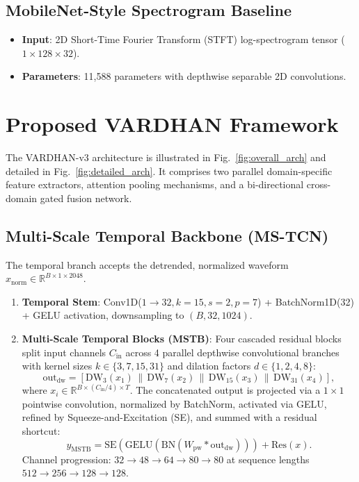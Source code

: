 \documentclass[journal,10pt,twocolumn]{IEEEtran}
\begin{document}
\subsection{MobileNet-Style Spectrogram Baseline}
\begin{itemize}
    \item \textbf{Input}: 2D Short-Time Fourier Transform (STFT) log-spectrogram tensor ($1 \times 128 \times 32$).
    \item \textbf{Parameters}: 11,588 parameters with depthwise separable 2D convolutions.
\end{itemize}

\section{Proposed VARDHAN Framework}
The VARDHAN-v3 architecture is illustrated in Fig.~\ref{fig:overall_arch} and detailed in Fig.~\ref{fig:detailed_arch}. It comprises two parallel domain-specific feature extractors, attention pooling mechanisms, and a bi-directional cross-domain gated fusion network.

\subsection{Multi-Scale Temporal Backbone (MS-TCN)}
The temporal branch accepts the detrended, normalized waveform $x_{\text{norm}} \in \mathbb{R}^{B \times 1 \times 2048}$.
\begin{enumerate}
    \item \textbf{Temporal Stem}: Conv1D($1 \rightarrow 32, k=15, s=2, p=7$) + BatchNorm1D(32) + GELU activation, downsampling to $(B, 32, 1024)$.
    \item \textbf{Multi-Scale Temporal Blocks (MSTB)}: Four cascaded residual blocks split input channels $C_{\text{in}}$ across 4 parallel depthwise convolutional branches with kernel sizes $k \in \{3, 7, 15, 31\}$ and dilation factors $d \in \{1, 2, 4, 8\}$:
    \begin{equation}
    \text{out}_{\text{dw}} = \left[ \text{DW}_3(x_1) \,\|\, \text{DW}_7(x_2) \,\|\, \text{DW}_{15}(x_3) \,\|\, \text{DW}_{31}(x_4) \right],
    \label{eq:mstb_dw}
    \end{equation}
    where $x_i \in \mathbb{R}^{B \times (C_{\text{in}}/4) \times T}$. The concatenated output is projected via a $1 \times 1$ pointwise convolution, normalized by BatchNorm, activated via GELU, refined by Squeeze-and-Excitation (SE), and summed with a residual shortcut:
    \begin{equation}
    y_{\text{MSTB}} = \text{SE}\left(\text{GELU}\left(\text{BN}\left(W_{\text{pw}} \ast \text{out}_{\text{dw}}\right)\right)\right) + \text{Res}(x).
    \label{eq:mstb_out}
    \end{equation}
    Channel progression: $32 \rightarrow 48 \rightarrow 64 \rightarrow 80 \rightarrow 80$ at sequence lengths $512 \rightarrow 256 \rightarrow 128 \rightarrow 128$.
\end{enumerate}
\end{document}
